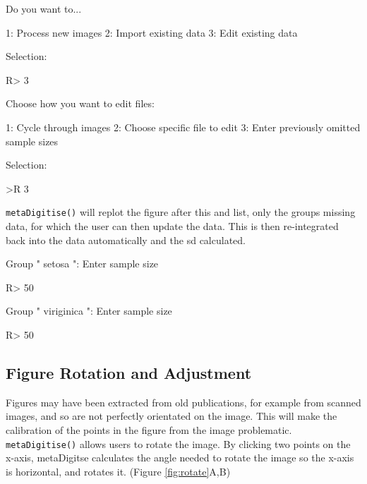 \documentclass[12pt]{article}
\newcommand{\fct}[1]{\texttt{#1()}}
\begin{document}
\begin{CodeChunk}
\begin{CodeOutput}
Do you want to...

1: Process new images
2: Import existing data
3: Edit existing data

Selection:
\end{CodeOutput}
\begin{CodeInput}
R> 3
\end{CodeInput}
\end{CodeChunk}

\begin{CodeChunk}
\begin{CodeOutput}
Choose how you want to edit files:

1: Cycle through images
2: Choose specific file to edit
3: Enter previously omitted sample sizes

Selection:
\end{CodeOutput}
\begin{CodeInput}
>R 3
\end{CodeInput}
\end{CodeChunk}

\fct{metaDigitise} will replot the figure after this and list, only the groups missing data, for which the user can then update the data. This is then re-integrated back into the data automatically and the sd calculated. 

\begin{CodeChunk}
\begin{CodeOutput}
Group " setosa ": Enter sample size  
\end{CodeOutput}
\begin{CodeInput}
R> 50
\end{CodeInput}
\begin{CodeOutput}
Group " viriginica ": Enter sample size
\end{CodeOutput}
\begin{CodeInput}
R> 50
\end{CodeInput}
\end{CodeChunk}


\subsection{Figure Rotation and Adjustment}
Figures may have been extracted from old publications, for example from scanned images, and so are not perfectly orientated on the image. This will make the calibration of the points in the figure from the image problematic. \fct{metaDigitise} allows users to rotate the image. By clicking two points on the x-axis, metaDigitse calculates the angle needed to rotate the image so the x-axis is horizontal, and rotates it. (Figure \ref{fig:rotate}A,B)
\end{document}
